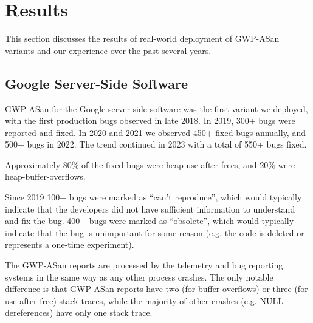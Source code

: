 \newcommand{\figCrashes}{%
  \begin{figure*}[t!]
    \centering
    \begin{tikzpicture}
      \node (img1)  {\texttt{[image: fig/crashes\_\_svg.pdf]}};
      \node[below=of img1, node distance=0cm, yshift=1.7cm] {Number of GWP-ASan crash reports received ($2^n$)};
      \node[left=of img1, node distance=0cm, rotate=90,anchor=center,yshift=-1.3cm] {Number of unique bugs ($10^n$)};
    \end{tikzpicture}
    \vspace{-1.2em}
    \caption{Bug occurrences across Google server-side applications, Android, and
    Chrome.}
    \label{fig:crashes}
  \end{figure*}
}

\section{Results}
\label{sec:results}

This section discusses the results of real-world deployment of GWP-ASan
variants and our experience over the past several years.

\subsection{Google Server-Side Software}

GWP-ASan for the Google server-side software was the first variant we deployed,
with the first production bugs observed in late 2018. In 2019, 300+ bugs were
reported and fixed. In 2020 and 2021 we observed 450+ fixed bugs annually, and
500+ bugs in 2022. The trend continued in 2023 with a total of 550+ bugs fixed.

Approximately 80\% of the fixed bugs were heap-use-after frees, and 20\% were
heap-buffer-overflows.

Since 2019 100+ bugs were marked as ``can't reproduce'', which would typically
indicate that the developers did not have sufficient information to understand
and fix the bug. 400+ bugs were marked as ``obsolete'', which would typically
indicate that the bug is unimportant for some reason (e.g. the code is deleted
or represents a one-time experiment).

The GWP-ASan reports are processed by the telemetry and bug reporting systems
in the same way as any other process crashes. The only notable difference is
that GWP-ASan reports have two (for buffer overflows) or three (for use after
free) stack traces, while the majority of other crashes (e.g. NULL
dereferences) have only one stack trace.

